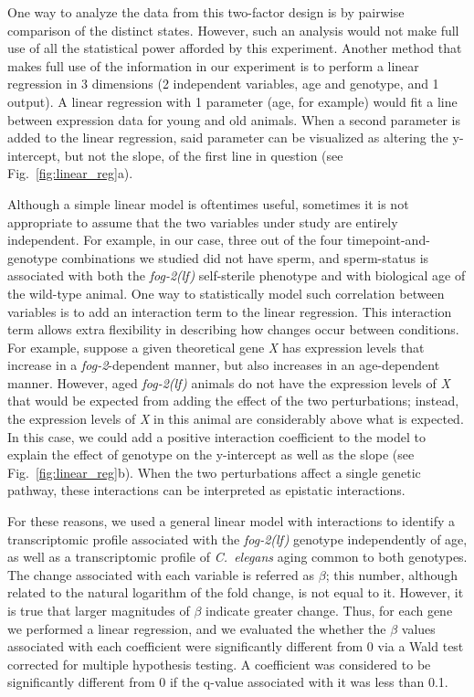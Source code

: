 \documentclass[9pt,twocolumn,twoside]{gsag3jnl}
\newcommand{\cel}{\emph{C.~elegans}}
\newcommand{\fog}{\emph{\mbox{fog-2(lf)}}}
\newcommand{\gene}[1]{\emph{\mbox{#1}}}
\begin{document}
One way to analyze the data from this two-factor design is by pairwise
comparison of the distinct states. However, such an analysis would not make full
use of all the statistical power afforded by this experiment. Another method
that makes full use of the information in our experiment is to perform a linear
regression in 3 dimensions (2 independent variables, age and genotype, and 1
output). A linear regression with 1 parameter (age, for example) would fit a
line between expression data for young and old animals. When a second parameter
is added to the linear regression, said parameter can be visualized as altering
the y-intercept, but not the slope, of the first line in question (see
Fig.~\ref{fig:linear_reg}a).

Although a simple linear model is oftentimes useful, sometimes it is not
appropriate to assume that the two variables under study are entirely
independent. For example, in our case, three out of the four timepoint-and-genotype
combinations we studied did not have sperm, and sperm-status is
associated with both the \fog{} self-sterile phenotype and with biological age
of the wild-type animal. One way to statistically model such correlation between
variables is to add an interaction term to the linear regression.
This interaction term allows extra flexibility in describing how changes occur
between conditions.
For example, suppose a given theoretical gene \gene{X} has expression levels that
increase in a \gene{fog-2}-dependent manner, but also increases in an
age-dependent manner. However, aged \fog{} animals do not have the expression levels
of \gene{X} that would be expected from adding the effect of the two perturbations;
instead, the expression levels of \gene{X} in this animal are considerably above
what is expected. In this case, we could add a positive interaction coefficient
to the model to explain the effect of genotype on the y-intercept as well as the
slope (see Fig.~\ref{fig:linear_reg}b). When the two perturbations affect a
single genetic pathway, these interactions can be interpreted as epistatic
interactions.

For these reasons, we used a general linear model
with interactions to identify a transcriptomic profile associated with the
\fog{} genotype independently of age, as well as a transcriptomic profile of
\cel{} aging common to both genotypes. The change associated with each variable
is referred as $\beta$; this number, although related to the natural logarithm
of the fold change, is not equal to it. However, it is true that larger
magnitudes of $\beta$ indicate greater change. Thus, for each gene we performed
a linear regression, and we evaluated the whether the $\beta$ values associated
with each coefficient were significantly different from 0 via a Wald test
corrected for multiple hypothesis testing. A coefficient was considered to be
significantly different from 0 if the q-value associated with it was less than
0.1.
\end{document}
